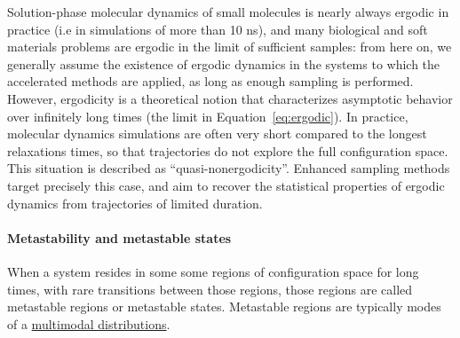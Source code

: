 \documentclass[9pt,review]{livecoms}
\begin{document}
Solution-phase molecular dynamics of small molecules is nearly always ergodic in practice (i.e in simulations of more than 10 ns), and many biological and soft materials problems are ergodic in the limit of sufficient samples: from here on, we generally assume the existence of ergodic dynamics in the systems to which the accelerated methods are applied, as long as enough sampling is performed.
However, ergodicity is a theoretical notion that characterizes asymptotic behavior over infinitely long times (the limit in Equation~\ref{eq:ergodic}).
In practice, molecular dynamics simulations are often very short compared to the longest relaxations times, so that trajectories do not explore the full configuration space.
This situation is described as ``quasi-nonergodicity''.
Enhanced sampling methods target precisely this case, and aim to recover the statistical properties of ergodic dynamics from trajectories of limited duration.

\hypertarget{ref:metastab} {\paragraph{Metastability and metastable states}}
When a system resides in some some regions of configuration space for long times, with rare transitions between those regions, those regions are called metastable regions or metastable states. Metastable regions are typically modes of a \hyperlink{ref:multimodal} {multimodal distributions}.
\end{document}
